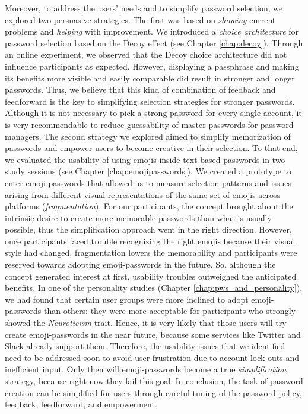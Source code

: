 Moreover, to address the users' needs and to simplify password selection, we explored two persuasive strategies. The first was based on \textit{showing} current problems and \textit{helping} with improvement. We introduced a \textit{choice architecture} for password selection based on the Decoy effect (see Chapter \ref{chap:decoy}). Through an online experiment, we observed that the Decoy choice architecture did not influence participants as expected. However, displaying a passphrase and making its benefits more visible and easily comparable did result in stronger and longer passwords. Thus, we believe that this kind of combination of feedback and feedforward is the key to simplifying selection strategies for stronger passwords. Although it is not necessary to pick a strong password for every single account, it is very recommendable to reduce guessability of master-passwords for password managers. 
The second strategy we explored aimed to simplify memorization of passwords and empower users to become creative in their selection. To that end, we evaluated the usability of using emojis inside text-based passwords in two study sessions (see Chapter \ref{chap:emojipasswords}). We created a prototype to enter emoji-passwords that allowed us to measure selection patterns and issues arising from different visual representations of the same set of emojis across platforms (\textit{fragmentation}). For our participants, the concept brought about the intrinsic desire to create more memorable passwords than what is usually possible, thus the simplification approach went in the right direction. However, once participants faced trouble recognizing the right emojis because their visual style had changed, fragmentation lowers the memorability and participants were reserved towards adopting emoji-passwords in the future. So, although the concept generated interest at first, usability troubles outweighed the anticipated benefits. In one of the personality studies (Chapter \ref{chap:pws_and_personality}), we had found that certain user groups were more inclined to adopt emoji-passwords than others: they were more acceptable for participants who strongly showed the \textit{Neuroticism} trait. Hence, it is very likely that those users will try create emoji-passwords in the near future, because some services like Twitter and Slack already support them. Therefore, the usability issues that we identified need to be addressed soon to avoid user frustration due to account lock-outs and inefficient input. Only then will emoji-passwords become a true \textit{simplification} strategy, because right now they fail this goal. In conclusion, the task of password creation can be simplified for users through careful tuning of the password policy, feedback, feedforward, and empowerment. 

